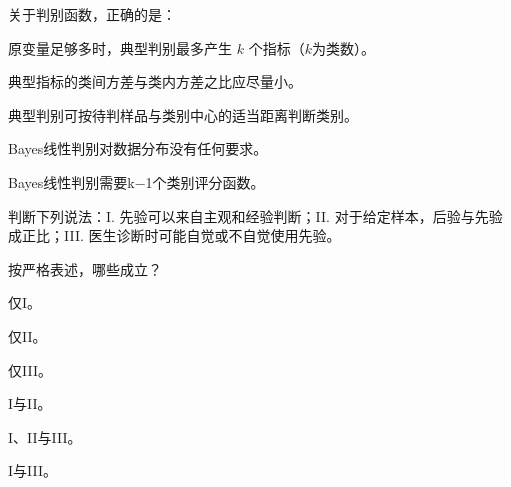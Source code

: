\par\addvspace{6pt}\noindent\begin{minipage}{\linewidth}


关于判别函数，正确的是：


\begin{choices}

\item 原变量足够多时，典型判别最多产生 \(k\) 个指标（\(k\)为类数）。

\item 典型指标的类间方差与类内方差之比应尽量小。

\item 典型判别可按待判样品与类别中心的适当距离判断类别。

\item Bayes线性判别对数据分布没有任何要求。

\item Bayes线性判别需要k−1个类别评分函数。

\end{choices}

\end{minipage}\par\vspace{4pt}

\par\addvspace{6pt}\noindent\begin{minipage}{\linewidth}


判断下列说法：I. 先验可以来自主观和经验判断；II. 对于给定样本，后验与先验成正比；III. 医生诊断时可能自觉或不自觉使用先验。

按严格表述，哪些成立？


\begin{choices}

\item 仅I。

\item 仅II。

\item 仅III。

\item I与II。

\item I、II与III。

\item I与III。

\end{choices}

\end{minipage}\par\vspace{4pt}


